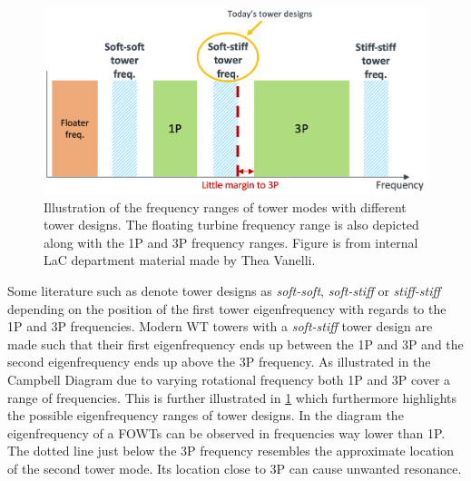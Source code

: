 \begin{figure}[ht]
	\centering
	\includegraphics[width=0.7\linewidth]{Graphics/1Pand3PvsTwrStiff.PNG}
	\caption{Illustration of the frequency ranges of tower modes with different tower designs. The floating turbine frequency range is also depicted along with the 1P and 3P frequency ranges. Figure is from internal LaC department material made by Thea Vanelli.}
	\label{fig:1p_and3p}
\end{figure}
Some literature such as \cite{Dykes2018} denote tower designs as \textit{soft-soft}, \textit{soft-stiff} or \textit{stiff-stiff} depending on the position of the first tower eigenfrequency with regards to the 1P and 3P frequencies. Modern WT towers with a \textit{soft-stiff} tower design are made such that their first eigenfrequency ends up between the 1P and 3P and the second eigenfrequency ends up above the 3P frequency. As illustrated in the Campbell Diagram due to varying rotational frequency both 1P and 3P cover a range of frequencies. This is further illustrated in \cref{fig:1p_and3p} which furthermore highlights the possible eigenfrequency ranges of tower designs. In the diagram the eigenfrequency of a FOWTs can be observed in frequencies way lower than 1P. The dotted line just below the 3P frequency resembles the approximate location of the second tower mode. Its location close to 3P can cause unwanted resonance.

